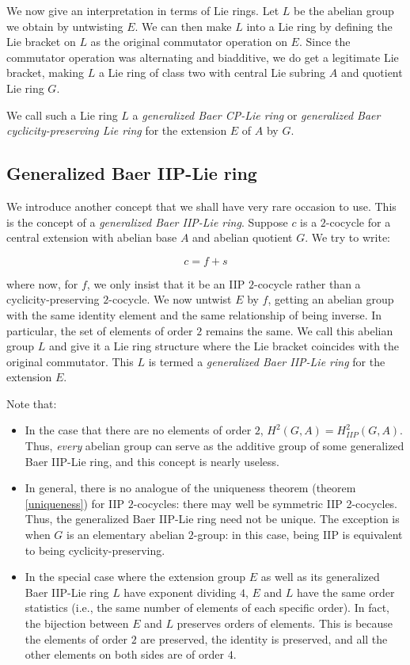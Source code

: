 \documentclass[10pt]{amsart}
\begin{document}
We now give an interpretation in terms of Lie rings. Let $L$ be the
abelian group we obtain by untwisting $E$. We can then make $L$ into a
Lie ring by defining the Lie bracket on $L$ as the original commutator
operation on $E$. Since the commutator operation was alternating and
biadditive, we do get a legitimate Lie bracket, making $L$ a Lie ring
of class two with central Lie subring $A$ and quotient Lie ring $G$.

We call such a Lie ring $L$ a {\em generalized Baer CP-Lie ring} or
{\em generalized Baer cyclicity-preserving Lie ring} for the extension
$E$ of $A$ by $G$.

\subsection{Generalized Baer IIP-Lie ring}

We introduce another concept that we shall have very rare occasion to
use. This is the concept of a {\em generalized Baer IIP-Lie
ring}. Suppose $c$ is a $2$-cocycle for a central extension with
abelian base $A$ and abelian quotient $G$. We try to write:

$$c = f + s$$

where now, for $f$, we only insist that it be an IIP $2$-cocycle
rather than a cyclicity-preserving $2$-cocycle. We now untwist $E$ by
$f$, getting an abelian group with the same identity element and the
same relationship of being inverse. In particular, the set of elements
of order $2$ remains the same. We call this abelian group $L$ and give
it a Lie ring structure where the Lie bracket coincides with the
original commutator. This $L$ is termed a {\em generalized Baer
IIP-Lie ring} for the extension $E$.

Note that:

\begin{itemize}
\item In the case that there are no elements of order $2$, $H^2(G,A) =
  H^2_{IIP}(G,A)$. Thus, {\em every} abelian group can serve as the
  additive group of some generalized Baer IIP-Lie ring, and this
  concept is nearly useless.
\item In general, there is no analogue of the uniqueness theorem
  (theorem \ref{uniqueness}) for IIP $2$-cocycles: there may well be
  symmetric IIP 2-cocycles. Thus, the generalized Baer IIP-Lie ring
  need not be unique. The exception is when $G$ is an elementary
  abelian $2$-group: in this case, being IIP is equivalent to being
  cyclicity-preserving.
\item In the special case where the extension group $E$ as well as its
  generalized Baer IIP-Lie ring $L$ have exponent dividing $4$, $E$
  and $L$ have the same order statistics (i.e., the same number of
  elements of each specific order). In fact, the bijection between $E$
  and $L$ preserves orders of elements. This is because the elements
  of order $2$ are preserved, the identity is preserved, and all the
  other elements on both sides are of order $4$.
\end{itemize}
\end{document}
